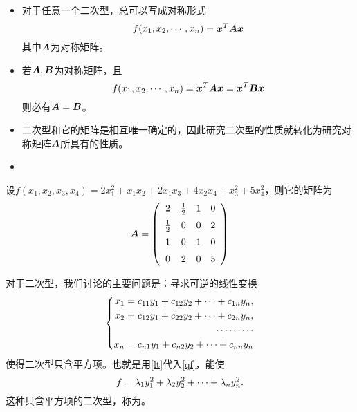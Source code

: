 \begin{frame}
  
  \begin{itemize}
  \item
    对于任意一个二次型，总可以写成对称形式
    $$
    f(x_1,x_2,\cdots,x_n)={\boldsymbol{x}}^T\boldsymbol{A}{\boldsymbol{x}}
    $$
    其中$\boldsymbol{A}$为对称矩阵。\\[0.1in]\pause
  \item
    若$\boldsymbol{A},\boldsymbol{B}$为对称矩阵，且
    $$
    f(x_1,x_2,\cdots,x_n)={\boldsymbol{x}}^T\boldsymbol{A}{\boldsymbol{x}}={\boldsymbol{x}}^T\boldsymbol{B}{\boldsymbol{x}}
    $$
    则必有$\boldsymbol{A}=\boldsymbol{B}$。\\[0.1in]\pause
  \item 二次型和它的矩阵是相互唯一确定的，因此研究二次型的性质就转化为研究对称矩阵$\boldsymbol{A}$所具有的性质。\\[0.1in]\pause
  \item {}
  \end{itemize}

  
\end{frame}

\begin{frame}
  
  \begin{li}
    设$f(x_1,x_2,x_3,x_4)=2x_1^2+x_1x_2+2x_1x_3+4x_2x_4+x_3^2+5x_4^2$，则它的矩阵为
    $$
    \boldsymbol{A}=\left(
      \begin{array}{cccc}
        2&\frac12&1&0\\[0.2cm]
        \frac12&0&0&2\\[0.2cm]
        1&0&1&0\\[0.2cm]
        0&2&0&5
      \end{array}
    \right)
    $$
  \end{li}
  
\end{frame}

\begin{frame}
  
  对于二次型，我们讨论的主要问题是：寻求可逆的线性变换
  \begin{equation}\label{lt}
  \left\{
    \begin{aligned}
      x_1=c_{11}y_1+c_{12}y_2+\cdots+c_{1n}y_n,\\
      x_2=c_{12}y_1+c_{22}y_2+\cdots+c_{2n}y_n,\\
      \cdots\cdots\cdots\\
      x_n=c_{n1}y_1+c_{n2}y_2+\cdots+c_{nn}y_n
    \end{aligned}
  \right.
  \end{equation}
  使得二次型只含平方项。也就是用\eqref{lt}代入\eqref{qf}，能使
  $$
  f=\lambda_1y_1^2+\lambda_2y_2^2+\cdots+\lambda_ny_n^2.
  $$
  这种只含平方项的二次型，称为。
\end{frame}

